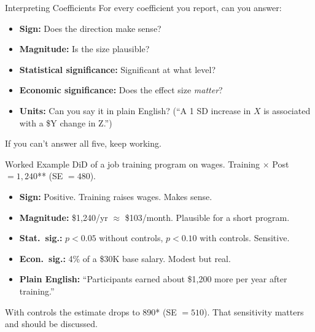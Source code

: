\begin{frame}{Interpreting Coefficients}
  For every coefficient you report, can you answer:

  \vspace{6pt}

  \begin{itemize}
    \item \textbf{Sign:} Does the direction make sense?
    \item \textbf{Magnitude:} Is the size plausible?
    \item \textbf{Statistical significance:} Significant at what level?
    \item \textbf{Economic significance:} Does the effect size \emph{matter}?
    \item \textbf{Units:} Can you say it in plain English? (``A 1 SD increase in $X$ is associated with a \$Y change in Z.'')
  \end{itemize}

  \vspace{6pt}

  If you can't answer all five, keep working.
\end{frame}

\begin{frame}{Worked Example}
  \small
  DiD of a job training program on wages. Training $\times$ Post $= 1{,}240$** (SE $= 480$).

  \vspace{4pt}

  \begin{itemize}
    \item \textbf{Sign:} Positive. Training raises wages. Makes sense.
    \item \textbf{Magnitude:} \$1,240/yr $\approx$ \$103/month. Plausible for a short program.
    \item \textbf{Stat.\ sig.:} $p < 0.05$ without controls, $p < 0.10$ with controls. Sensitive.
    \item \textbf{Econ.\ sig.:} 4\% of a \$30K base salary. Modest but real.
    \item \textbf{Plain English:} ``Participants earned about \$1,200 more per year after training.''
  \end{itemize}

  \vspace{4pt}

  With controls the estimate drops to 890* (SE $= 510$). That sensitivity matters and should be discussed.
\end{frame}

